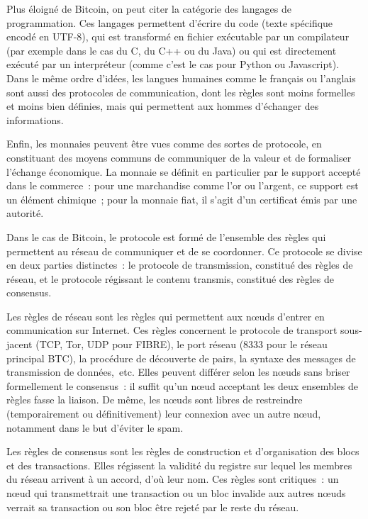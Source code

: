 Plus éloigné de Bitcoin, on peut citer la catégorie des langages de programmation. Ces langages permettent d'écrire du code (texte spécifique encodé en UTF-8), qui est transformé en fichier exécutable par un compilateur (par exemple dans le cas du C, du C++ ou du Java) ou qui est directement exécuté par un interpréteur (comme c'est le cas pour Python ou Javascript). Dans le même ordre d'idées, les langues humaines comme le français ou l'anglais sont aussi des protocoles de communication, dont les règles sont moins formelles et moins bien définies, mais qui permettent aux hommes d'échanger des informations.

Enfin, les monnaies peuvent être vues comme des sortes de protocole, en constituant des moyens communs de communiquer de la valeur et de formaliser l'échange économique. La monnaie se définit en particulier par le support accepté dans le commerce~: pour une marchandise comme l'or ou l'argent, ce support est un élément chimique~; pour la monnaie fiat, il s'agit d'un certificat émis par une autorité.

Dans le cas de Bitcoin, le protocole est formé de l'ensemble des règles qui permettent au réseau de communiquer et de se coordonner. Ce protocole se divise en deux parties distinctes~: le protocole de transmission, constitué des règles de réseau, et le protocole régissant le contenu transmis, constitué des règles de consensus.

Les règles de réseau sont les règles qui permettent aux nœuds d'entrer en communication sur Internet. Ces règles concernent le protocole de transport sous-jacent (TCP, Tor, UDP pour FIBRE), le port réseau (8333 pour le réseau principal BTC), la procédure de découverte de pairs, la syntaxe des messages de transmission de données,~etc. Elles peuvent différer selon les nœuds sans briser formellement le consensus~: il suffit qu'un nœud acceptant les deux ensembles de règles fasse la liaison. De même, les nœuds sont libres de restreindre (temporairement ou définitivement) leur connexion avec un autre nœud, notamment dans le but d'éviter le spam.

Les règles de consensus sont les règles de construction et d'organisation des blocs et des transactions. Elles régissent la validité du registre sur lequel les membres du réseau arrivent à un accord, d'où leur nom. Ces règles sont critiques~: un nœud qui transmettrait une transaction ou un bloc invalide aux autres nœuds verrait sa transaction ou son bloc être rejeté par le reste du réseau.

